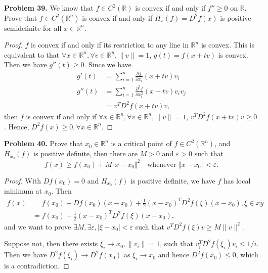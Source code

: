 \documentclass[12pt,leqno]{amsart}
\theoremstyle{definition}
\begin{document}
\medskip

\noindent
{\bf Problem 39.}
We know that $f\in C^2(\mathbb{R})$ is convex if and only if $f''\geq 0$ on $\mathbb{R}$. Prove that $f\in C^2(\mathbb{R}^n)$ is convex if and only if
$H_x(f)=D^2f(x)$ is positive semidefinite for all $x\in\mathbb{R}^n$.
\begin{proof}
$f$ is convex if and only if its restriction to any line in $\mathbb{R}^n$ is convex. This is equivalent to that $\forall x\in \mathbb{R}^n, \forall v \in \mathbb{R}^n, \|v\| = 1$, $g(t) = f(x+tv)$ is convex. Then we have $g''(t) \geq 0$. Since we have 
\begin{align*}
    g'(t) & = \sum^n_{i=1} \frac{\partial f}{\partial x_i}(x+tv) v_i \\
    g''(t) & = \sum^n_{i=1} \frac{\partial^2 f}{\partial x_i^2}(x+tv) v_i v_j\\
    & = v^T D^2f(x+tv)v,
\end{align*}
then $f$ is convex if and only if $\forall x\in \mathbb{R}^n, \forall v \in \mathbb{R}^n, \|v\| = 1$, $v^T D^2f(x+tv)v \geq 0$. Hence, $D^2f(x) \geq 0, \forall x \in \mathbb{R}^n$.
\end{proof}

\medskip

\noindent
{\bf Problem 40.}
Prove that $x_0\in\mathbb{R}^n$ is a critical point of $f\in C^2(\mathbb{R}^n)$, and $H_{x_0}(f)$ is positive definite, then there are $M>0$ and $\varepsilon>0$ such that
$$
f(x)\geq f(x_0)+M\Vert x-x_0\Vert^2
\quad
\text{whenever $\Vert x-x_0\Vert<\varepsilon$.}
$$
\begin{proof}
With $Df(x_0) = 0$ and $H_{x_0}(f)$ is positive definite, we have $f$ has local minimum at $x_0$. Then 
\begin{align*}
    f(x) & = f(x_0) + Df(x_0)(x-x_0) + \frac{1}{2} (x-x_0)^T D^2f(\xi) (x-x_0), \xi \in \overline{xy} \\
    & = f(x_0) + \frac{1}{2} (x-x_0)^T D^2f(\xi) (x-x_0),
\end{align*}
and we want to prove $\exists M, \exists \varepsilon, |\xi - x_0| < \varepsilon$ such that $v^T D^2f(\xi)v \geq M\|v\|^2$. 

Suppose not, then there exists $\xi_i \to x_0, \|v_i\| = 1$, such that $v_i^T D^2f(\xi_i)v_i \leq 1/i$. Then we have $D^2f(\xi_i) \to D^2f(x_0)$ as $\xi_i\to x_0$ and hence $D^2f(x_0) \leq 0$, which is a contradiction.
\end{proof}

\medskip
\end{document}
